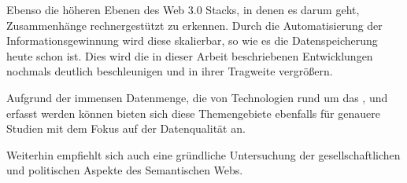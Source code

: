 Ebenso die höheren Ebenen des Web 3.0 Stacks, in denen es darum geht, Zusammenhänge rechnergestützt zu erkennen. Durch die Automatisierung der Informationsgewinnung wird diese skalierbar, so wie es die Datenspeicherung heute schon ist. Dies wird die in dieser Arbeit beschriebenen Entwicklungen nochmals deutlich beschleunigen und in ihrer Tragweite vergrößern. 

Aufgrund der immensen Datenmenge, die von Technologien rund um das ,  und  erfasst werden können bieten sich diese Themengebiete ebenfalls für genauere Studien mit dem Fokus auf der Datenqualität an.

Weiterhin empfiehlt sich auch eine gründliche Untersuchung der gesellschaftlichen und politischen Aspekte des Semantischen Webs.